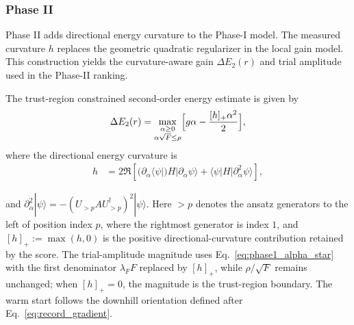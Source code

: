 \documentclass[
  reprint,
  amsmath,
  amssymb,
  aps,
  pra,
  nofootinbib,
  superscriptaddress,
  floatfix
]{revtex4-2}
\newcommand{\ket}[1]{|#1\rangle}
\begin{document}
\subsubsection{Phase II}
%
\noindent
Phase II adds directional energy curvature to the Phase-I model. The measured
curvature \(h\) replaces the geometric quadratic regularizer in the local gain
model. This construction yields the curvature-aware gain \(\Delta E_2(r)\) and
trial amplitude used in the Phase-II ranking.

The trust-region constrained second-order energy estimate is given by
\begin{equation*}
\Delta E_{2}(r)
=\max_{\substack{\alpha\ge0\\\alpha\sqrt{F}\le\rho}}
\Bigl[g\alpha -\frac{[h]_+\alpha^2}{2}\Bigr],
\end{equation*}
where the directional energy curvature is
\begin{align*}
h&=
2\Re\!\left[
(\partial_{\alpha}\langle \psi|)H|\partial_{\alpha}\psi\rangle
+\langle\psi|H|\partial^2_{\alpha}\psi\rangle
\right],
\end{align*}
  
and $\partial^2_{\alpha}\ket{\psi} =-(U_{>p}AU_{>p}^{\dagger})^2\ket{\psi}.$ Here \(>p\) denotes the ansatz generators to the left of position index \(p\), where the rightmost generator is index \(1\), and \([h]_+:=\max(h,0)\) is the positive directional-curvature contribution retained by the score. The trial-amplitude magnitude uses Eq.~\eqref{eq:phase1_alpha_star} with the first denominator \(\lambda_FF\) replaced by \([h]_+\), while \(\rho/\sqrt{F}\) remains unchanged; when \([h]_+=0\), the magnitude is the trust-region boundary. The warm start follows the downhill orientation defined after Eq.~\eqref{eq:record_gradient}.
\end{document}
